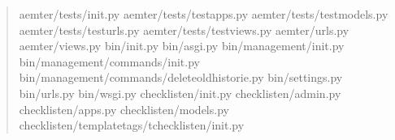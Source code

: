 \documentclass[letterpaper,10pt,english]{sphinxmanual}
\begin{document}
\begin{quote}
\begin{sphinxVerbatim}[commandchars=\\\{\}]
aemter/tests/\PYGZus{}\PYGZus{}init\PYGZus{}\PYGZus{}.py                                               \PYGZpc{}
aemter/tests/test\PYGZus{}apps.py                                              \PYGZpc{}
aemter/tests/test\PYGZus{}models.py                                           \PYGZpc{}
aemter/tests/test\PYGZus{}urls.py                                              \PYGZpc{}
aemter/tests/test\PYGZus{}views.py                                            \PYGZpc{}
aemter/urls.py                                                         \PYGZpc{}
aemter/views.py                                                       \PYGZpc{}
bin/\PYGZus{}\PYGZus{}init\PYGZus{}\PYGZus{}.py                                                        \PYGZpc{}
bin/asgi.py                                                              \PYGZpc{}
bin/management/\PYGZus{}\PYGZus{}init\PYGZus{}\PYGZus{}.py                                             \PYGZpc{}
bin/management/commands/\PYGZus{}\PYGZus{}init\PYGZus{}\PYGZus{}.py                                    \PYGZpc{}
bin/management/commands/delete\PYGZus{}old\PYGZus{}historie.py                         \PYGZpc{}
bin/settings.py                                                       \PYGZpc{}
bin/urls.py                                                            \PYGZpc{}
bin/wsgi.py                                                              \PYGZpc{}
checklisten/\PYGZus{}\PYGZus{}init\PYGZus{}\PYGZus{}.py                                                \PYGZpc{}
checklisten/admin.py                                                   \PYGZpc{}
checklisten/apps.py                                                    \PYGZpc{}
checklisten/models.py                                                 \PYGZpc{}
checklisten/templatetags/t\PYGZus{}checklisten/\PYGZus{}\PYGZus{}init\PYGZus{}\PYGZus{}.py                     \PYGZpc{}

\end{sphinxVerbatim}
\end{quote}
\end{document}
